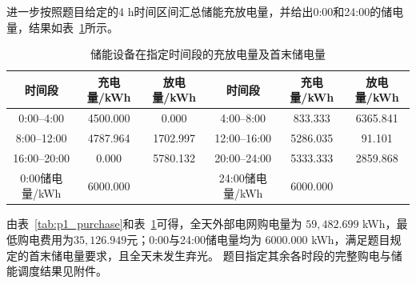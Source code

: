 进一步按照题目给定的4 h时间区间汇总储能充放电量，并给出0:00和24:00的储电量，结果如表~\ref{tab:p1_storage}所示。

\begin{table}[H]
\centering
\caption{储能设备在指定时间段的充放电量及首末储电量}
\label{tab:p1_storage}
\begin{tabular}{cccccc}
\hline
时间段 & 充电量/kWh & 放电量/kWh
& 时间段 & 充电量/kWh & 放电量/kWh \\
\hline
0:00--4:00   & 4500.000 & 0.000
& 4:00--8:00   & 833.333  & 6365.841 \\

8:00--12:00  & 4787.964 & 1702.997
& 12:00--16:00 & 5286.035 & 91.101 \\

16:00--20:00 & 0.000    & 5780.132
& 20:00--24:00 & 5333.333 & 2859.868 \\
\hline
0:00储电量/kWh & 6000.000 & {}
& 24:00储电量/kWh & 6000.000 & {} \\
\hline
\end{tabular}
\end{table}

由表~\ref{tab:p1_purchase}和表~\ref{tab:p1_storage}可得，全天外部电网购电量为
$59,482.699$ kWh，最低购电费用为$35,126.949$元；0:00与24:00储电量均为
$6000.000$ kWh，满足题目规定的首末储电量要求，且全天未发生弃光。
题目指定其余各时段的完整购电与储能调度结果见附件。






















